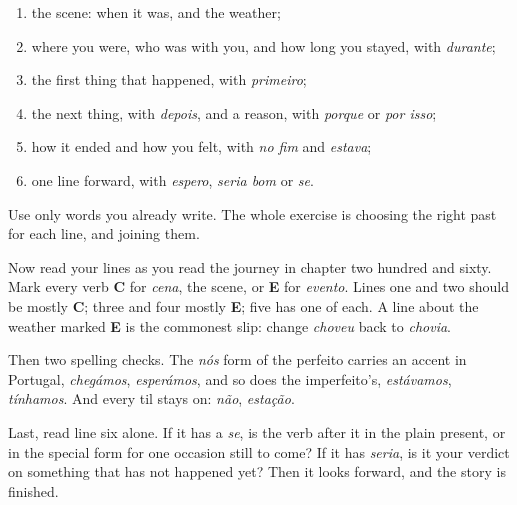 \begin{enumerate}
\raggedright
  \item the scene: when it was, and the weather;
  \item where you were, who was with you, and how long you stayed, with \emph{durante};
  \item the first thing that happened, with \emph{primeiro};
  \item the next thing, with \emph{depois}, and a reason, with \emph{porque} or \emph{por isso};
  \item how it ended and how you felt, with \emph{no fim} and \emph{estava};
  \item one line forward, with \emph{espero}, \emph{seria bom} or \emph{se}.
\end{enumerate}

Use only words you already write. The whole exercise is choosing the right past for each line, and joining them.

\begin{tcolorbox}[breakable,colback=teal!4,colframe=teal!35!black,title={Before you move on}]
Now read your lines as you read the journey in chapter two hundred and sixty. Mark every verb \textbf{C} for \emph{cena}, the scene, or \textbf{E} for \emph{evento}. Lines one and two should be mostly \textbf{C}; three and four mostly \textbf{E}; five has one of each. A line about the weather marked \textbf{E} is the commonest slip: change \emph{choveu} back to \emph{chovia}.

Then two spelling checks. The \emph{nós} form of the perfeito carries an accent in Portugal, \emph{chegámos}, \emph{esperámos}, and so does the imperfeito's, \emph{estávamos}, \emph{tínhamos}. And every til stays on: \emph{não}, \emph{estação}.

Last, read line six alone. If it has a \emph{se}, is the verb after it in the plain present, or in the special form for one occasion still to come? If it has \emph{seria}, is it your verdict on something that has not happened yet? Then it looks forward, and the story is finished.
\end{tcolorbox}

